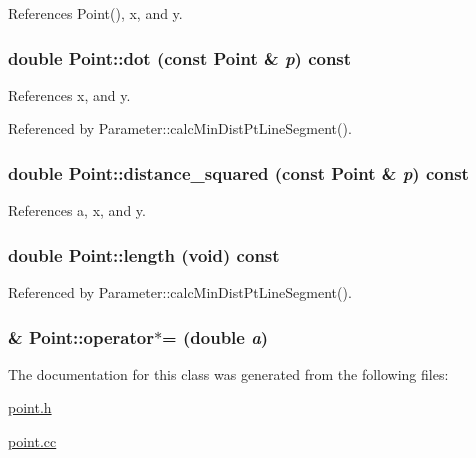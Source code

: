 References Point(), x, and y.\hypertarget{classPoint_a51050f8b9868c12b1a9d063e8555d05}{
\subsubsection[dot]{\setlength{\rightskip}{0pt plus 5cm}double Point::dot (const {\bf Point} \& {\em p}) const}}
\label{classPoint_a51050f8b9868c12b1a9d063e8555d05}




References x, and y.

Referenced by Parameter::calcMinDistPtLineSegment().\hypertarget{classPoint_99717644bf38e3868c9ff7f32f4a9226}{
\subsubsection[distance\_\-squared]{\setlength{\rightskip}{0pt plus 5cm}double Point::distance\_\-squared (const {\bf Point} \& {\em p}) const}}
\label{classPoint_99717644bf38e3868c9ff7f32f4a9226}




References a, x, and y.\hypertarget{classPoint_41052067de2f7e0be2bf0b60c1e7f60d}{
\subsubsection[length]{\setlength{\rightskip}{0pt plus 5cm}double Point::length (void) const}}
\label{classPoint_41052067de2f7e0be2bf0b60c1e7f60d}




Referenced by Parameter::calcMinDistPtLineSegment().\hypertarget{classPoint_aed1420449367308540f3459049ac2bd}{
\subsubsection[operator$\ast$=]{\& Point::operator$\ast$= (double {\em a})}}
\label{classPoint_aed1420449367308540f3459049ac2bd}




The documentation for this class was generated from the following files:\begin{CompactItemize}
\item 
\hyperlink{point_8h}{point.h}\item 
\hyperlink{point_8cc}{point.cc}\end{CompactItemize}
